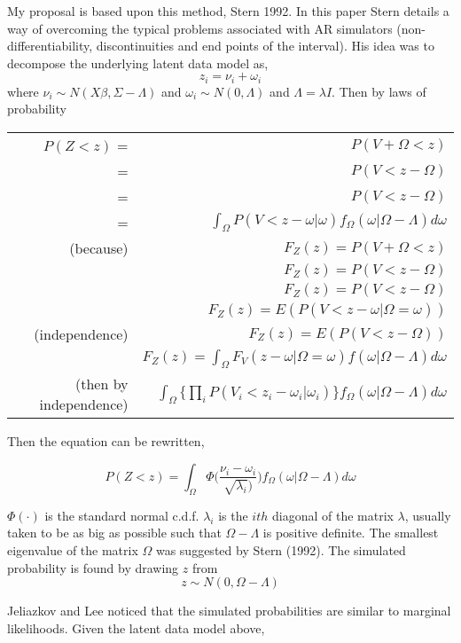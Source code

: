 \documentclass[]{article}
\begin{document}
My proposal is based upon this method, Stern 1992. In this paper Stern details a way of overcoming the typical problems associated with AR simulators (non-differentiability, discontinuities and end points of the interval). His idea was to decompose the underlying latent data model as, 
\[ z_i = \nu_i + \omega_i \]
where $ \nu_i \sim N(X\beta, \Sigma - \Lambda) $ and $ \omega_i \sim N(0, \Lambda) $ and $ \Lambda = \lambda I $. Then by laws of probability \\
\begin{table}[H]
\centering
\begin{tabular}{rr}
 $ P(Z < z) $ = & $ P(V + \Omega < z) $ \\ 
 = &  $ P(V < z - \Omega) $ \\
  = &  $ P(V < z - \Omega) $ \\
= & $ \int_{\Omega} P(V < z - \omega|\omega)f_{\Omega}(\omega|\Omega - \Lambda)d\omega $\\
(because) & $ F_Z(z) = P(V + \Omega < z)  $    \\
& $ F_Z(z) = P(V < z - \Omega)  $ \\
& $ F_Z(z) = P(V < z - \Omega)  $ \\
& $ F_Z(z) = E(P(V < z - \omega|\Omega=\omega))  $ \\
(independence) & $ F_Z(z) = E(P(V < z - \Omega))  $ \\
& $ F_Z(z) = \int_{\Omega}F_V(z - \omega|\Omega= \omega)f(\omega|\Omega - \Lambda)d\omega   $ \\
(then by independence)  & $ \int_{\Omega} \{\prod_i P(V_i < z_i - \omega_i|\omega_i)\}f_{\Omega}(\omega|\Omega - \Lambda)d\omega $\\
\end{tabular}
\end{table}
Then the equation can be rewritten,

\[  P(Z < z)  = \int_{\Omega} \Phi\Big( \frac{\nu_i - \omega_i}{\sqrt{\lambda_i} )}\Big) f_{\Omega}(\omega|\Omega - \Lambda)  d\omega \]

$ \Phi(\cdot) $ is the standard normal c.d.f. $ \lambda_i $ is  the $ ith $ diagonal of the matrix $ \lambda $, usually taken to be as big as possible such that $ \Omega - \Lambda $ is positive definite. The smallest eigenvalue of the matrix $ \Omega $ was suggested by Stern (1992). The simulated probability is found by drawing $ z $ from 
\[ z \sim N(0,  \Omega - \Lambda ) \]

Jeliazkov and Lee noticed that the simulated probabilities are similar to marginal likelihoods. Given the latent data model above, 
\end{document}
